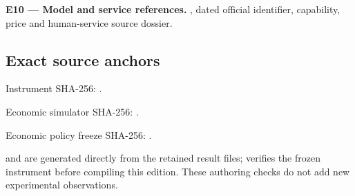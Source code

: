 \documentclass[10pt,a4paper]{article}
\begin{document}
\textbf{E10 --- Model and service references.}
, dated official identifier,
capability, price and human-service source dossier.

\hypertarget{exact-source-anchors}{%
\subsection{Exact source anchors}\label{exact-source-anchors}}

Instrument SHA-256:
.

Economic simulator SHA-256:
.

Economic policy freeze SHA-256:
.

 and  are generated directly
from the retained result files;  verifies the
frozen instrument before compiling this edition. These authoring checks
do not add new experimental observations.
\end{document}
